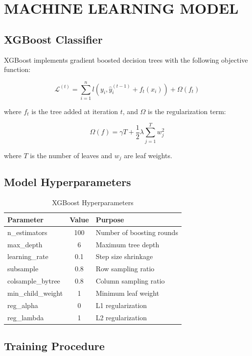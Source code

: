 \section{MACHINE LEARNING MODEL}

\subsection{XGBoost Classifier}

XGBoost implements gradient boosted decision trees with the following objective function:

$$\mathcal{L}^{(t)} = \sum_{i=1}^{n} l(y_i, \hat{y}_i^{(t-1)} + f_t(x_i)) + \Omega(f_t)$$

where $f_t$ is the tree added at iteration $t$, and $\Omega$ is the regularization term:

$$\Omega(f) = \gamma T + \frac{1}{2}\lambda \sum_{j=1}^{T} w_j^2$$

where $T$ is the number of leaves and $w_j$ are leaf weights.

\subsection{Model Hyperparameters}

\begin{table}[H]
\centering
\caption{XGBoost Hyperparameters}
\label{tab:hyperparams}
\begin{tabular}{|l|c|l|}
\hline
\textbf{Parameter} & \textbf{Value} & \textbf{Purpose} \\
\hline
n\_estimators & 100 & Number of boosting rounds \\
\hline
max\_depth & 6 & Maximum tree depth \\
\hline
learning\_rate & 0.1 & Step size shrinkage \\
\hline
subsample & 0.8 & Row sampling ratio \\
\hline
colsample\_bytree & 0.8 & Column sampling ratio \\
\hline
min\_child\_weight & 1 & Minimum leaf weight \\
\hline
reg\_alpha & 0 & L1 regularization \\
\hline
reg\_lambda & 1 & L2 regularization \\
\hline
\end{tabular}
\end{table}

\subsection{Training Procedure}


